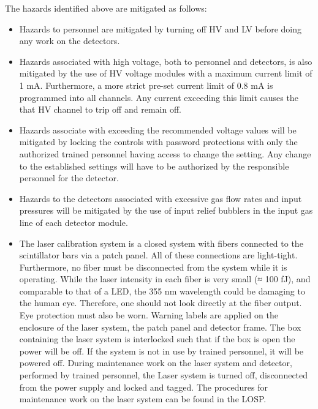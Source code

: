 The hazards identified above are mitigated as follows:
\begin{itemize}
\item  Hazards to personnel are mitigated by turning off HV and LV before doing any work on the detectors.
\item Hazards associated with high voltage, both to personnel and detectors, is also mitigated by the use of HV voltage modules with a maximum current limit of 1 mA. Furthermore, a more strict pre-set current limit of 0.8 mA is
programmed into all channels. Any current exceeding this limit causes the that HV channel to trip off and
remain off.
\item Hazards associate with exceeding the recommended voltage values will be mitigated by locking the controls
with password protections with only the authorized trained personnel having access to change the setting. Any
change to the established settings will have to be authorized by the responsible personnel for the detector.
\item Hazards to the detectors associated with excessive gas flow rates and input pressures will be mitigated by the use of input relief bubblers in the input gas line of each detector module.
\item The laser calibration system is a closed system with fibers connected to the
scintillator bars via a patch panel. All of these connections are light-tight.
Furthermore, no fiber must be disconnected from the system while it is
operating. While the laser intensity in each fiber is very small (≈ 100 fJ),
and comparable to that of a LED, the 355 nm wavelength could be damaging to the human eye. Therefore, one should not look directly at the fiber output.  Eye protection must also be worn.
Warning labels are applied on the enclosure of the laser system, the patch
panel and detector frame. The box containing the laser system is interlocked
such that if the box is open the power will be off. If the system is not in
use by trained personnel, it will be powered off. During maintenance work
on the laser system and detector, performed by trained personnel, the Laser
system is turned off, disconnected from the power supply and locked and
tagged. The procedures for maintenance work on the laser system can be
found in the LOSP.
\end{itemize}


